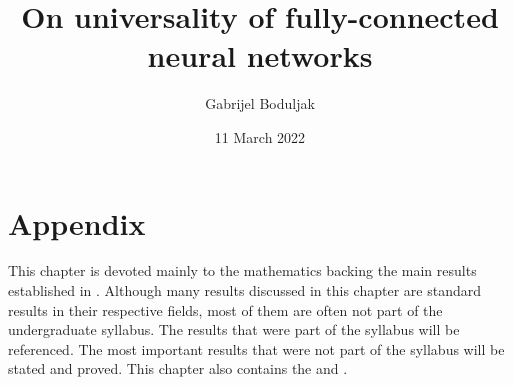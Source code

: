 \documentclass[12pt,oneside]{report}
\title{On universality of fully-connected neural networks}
\date{11 March 2022}
\author{Gabrijel Boduljak}
\theoremstyle{definition}
\theoremstyle{definition}
\theoremstyle{remark}
\theoremstyle{definition}
\theoremstyle{definition}
\theoremstyle{remark}
\begin{document}
\maketitle

\begin{abstract} 

\end{abstract}
\declaration
\dedication{I dedicate this thesis to my family, for their endless support and encouragement.}

\tableofcontents
{}
\newpage
{}







\chapter{Appendix}
\label{chapter:appendix}
This chapter is devoted mainly to the mathematics backing the main results established in .
Although many results discussed in this chapter are standard results in their respective fields, most of them are often not part of the undergraduate syllabus. The results that were part of the syllabus will be referenced. The most important results that were not part of the syllabus will be stated and proved.
This chapter also contains the  and .








%


\clearpage
{}
\printbibliography
\end{document}
